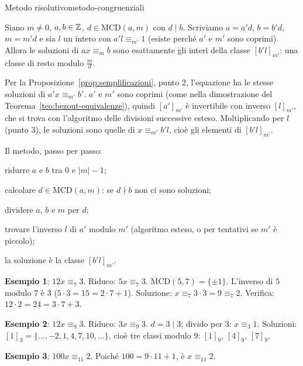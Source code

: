 \begin{concetto}
\begin{Teorema}{Metodo risolutivo}{metodo-congruenziali}
    \begin{prerequisiti}
    \end{prerequisiti}
    Siano $m \neq 0$, $a, b \in \mathbb{Z}$, $d \in \mathrm{MCD}(a, m)$ con $d \mid b$. Scriviamo $a = a'd$, $b = b'd$, $m = m'd$ e sia $l$ un intero con
    $a'l \equiv_{m'} 1$ (esiste perché $a'$ e $m'$ sono coprimi). Allora le soluzioni di $ax \equiv_m b$ sono esattamente gli interi della classe
    $[b'l]_{m'}$: una classe di resto modulo $\frac{m}{d}$.
\end{Teorema}
\begin{dimostrazione}
    Per la Proposizione~\ref{prop:semplificazioni}, punto 2, l'equazione ha le stesse soluzioni di $a'x \equiv_{m'} b'$. $a'$ e $m'$ sono coprimi
    (come nella dimostrazione del Teorema~\ref{teo:bezout-equivalenze}), quindi $[a']_{m'}$ è invertibile con inverso $[l]_{m'}$, che si trova con
    l'algoritmo delle divisioni successive esteso. Moltiplicando per $l$ (punto 3), le soluzioni sono quelle di $x \equiv_{m'} b'l$, cioè
    gli elementi di $[b'l]_{m'}$.
\end{dimostrazione}
\end{concetto}

\begin{spiegazione}
    Il metodo, passo per passo:
    \begin{passi}
        \item ridurre $a$ e $b$ tra $0$ e $|m| - 1$;
        \item calcolare $d \in \mathrm{MCD}(a, m)$: se $d \nmid b$ non ci sono soluzioni;
        \item dividere $a$, $b$ e $m$ per $d$;
        \item trovare l'inverso $l$ di $a'$ modulo $m'$ (algoritmo esteso, o per tentativi se $m'$ è piccolo);
        \item la soluzione è la classe $[b'l]_{m'}$.
    \end{passi}
    \textbf{Esempio 1}: $12x \equiv_7 3$. Riduco: $5x \equiv_7 3$. $\mathrm{MCD}(5, 7) = \{\pm 1\}$. L'inverso di $5$ modulo $7$ è $3$ ($5 \cdot 3 = 15 = 2 \cdot 7 + 1$).
    Soluzione: $x \equiv_7 3 \cdot 3 = 9 \equiv_7 2$. Verifica: $12 \cdot 2 = 24 = 3 \cdot 7 + 3$.

    \textbf{Esempio 2}: $12x \equiv_9 3$. Riduco: $3x \equiv_9 3$. $d = 3 \mid 3$; divido per $3$: $x \equiv_3 1$. Soluzioni: $[1]_3 = \{\dots, -2, 1, 4, 7, 10, \dots\}$,
    cioè tre classi modulo $9$: $[1]_9$, $[4]_9$, $[7]_9$.

    \textbf{Esempio 3}: $100x \equiv_{11} 2$. Poiché $100 = 9 \cdot 11 + 1$, è $x \equiv_{11} 2$.
\end{spiegazione}


